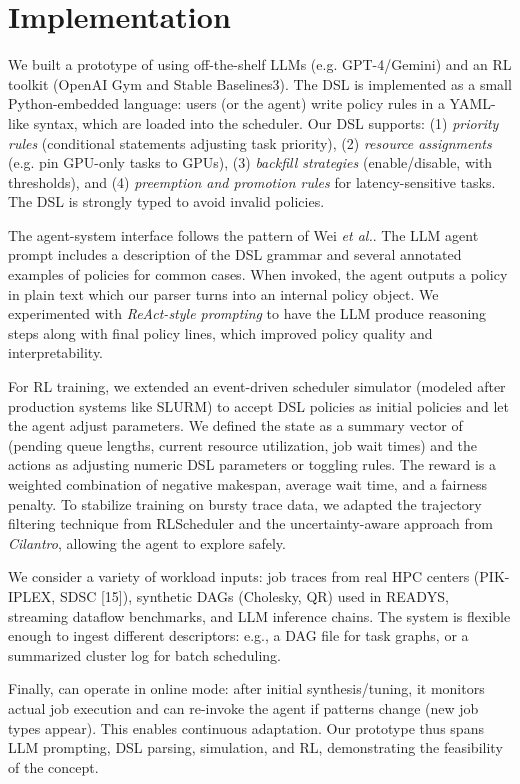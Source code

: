 \section{Implementation}

We built a prototype of \sys{} using off-the-shelf LLMs (e.g. GPT-4/Gemini) and an RL toolkit (OpenAI Gym and Stable Baselines3). The DSL is implemented as a small Python-embedded language: users (or the agent) write policy rules in a YAML-like syntax, which are loaded into the scheduler. Our DSL supports: (1) \emph{priority rules} (conditional statements adjusting task priority), (2) \emph{resource assignments} (e.g. pin GPU-only tasks to GPUs), (3) \emph{backfill strategies} (enable/disable, with thresholds), and (4) \emph{preemption and promotion rules} for latency-sensitive tasks. The DSL is strongly typed to avoid invalid policies.

The agent-system interface follows the pattern of Wei \emph{et al.}. The LLM agent prompt includes a description of the DSL grammar and several annotated examples of policies for common cases. When invoked, the agent outputs a policy in plain text which our parser turns into an internal policy object. We experimented with \emph{ReAct-style prompting} to have the LLM produce reasoning steps along with final policy lines, which improved policy quality and interpretability.

For RL training, we extended an event-driven scheduler simulator (modeled after production systems like SLURM) to accept DSL policies as initial policies and let the agent adjust parameters. We defined the state as a summary vector of (pending queue lengths, current resource utilization, job wait times) and the actions as adjusting numeric DSL parameters or toggling rules. The reward is a weighted combination of negative makespan, average wait time, and a fairness penalty. To stabilize training on bursty trace data, we adapted the trajectory filtering technique from RLScheduler and the uncertainty-aware approach from \emph{Cilantro}, allowing the agent to explore safely.

We consider a variety of workload inputs: job traces from real HPC centers (PIK-IPLEX, SDSC [15]), synthetic DAGs (Cholesky, QR) used in READYS, streaming dataflow benchmarks, and LLM inference chains. The system is flexible enough to ingest different descriptors: e.g., a DAG file for task graphs, or a summarized cluster log for batch scheduling.

Finally, \sys{} can operate in online mode: after initial synthesis/tuning, it monitors actual job execution and can re-invoke the agent if patterns change (new job types appear). This enables continuous adaptation. Our prototype thus spans LLM prompting, DSL parsing, simulation, and RL, demonstrating the feasibility of the concept.